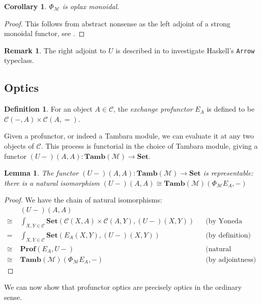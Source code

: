 \documentclass[11pt,a4paper]{article}
\theoremstyle{plain}
\newtheorem{lemma}[theorem]{Lemma}
\newtheorem{corollary}[theorem]{Corollary}
\theoremstyle{definition}
\newtheorem{definition}[theorem]{Definition}
\newtheorem{remark}[theorem]{Remark}
\newcommand{\C}{\mathscr{C}}
\newcommand{\M}{\mathscr{M}}
\newcommand{\Pastro}{\Phi}
\newcommand{\Set}{\mathbf{Set}}
\newcommand{\Prof}{\mathbf{Prof}}
\newcommand{\Tamb}{\mathbf{Tamb}}
\begin{document}
\begin{corollary}
  $\Pastro_\M$ is oplax monoidal.
\end{corollary}
\begin{proof}
  This follows from abstract nonsense as the left adjoint of a strong monoidal functor, see \cite{Kelly1974}.
\end{proof}

\begin{remark}
  The right adjoint to $U$ is described in \cite{NotionsOfComputationAsMonoids} to investigate Haskell's \texttt{Arrow} typeclass.
\end{remark}

\subsection{Optics}
\begin{definition}
  For an object $A \in \C$, the \emph{exchange profunctor} $E_A$ is defined to be $\C(-, A) \times \C(A, {=})$.
\end{definition}

Given a profunctor, or indeed a Tambara module, we can evaluate it at any two objects of $\C$. This process is functorial in the choice of Tambara module, giving a functor $(U-)(A,A) : \Tamb(\M) \to \Set$.

\begin{lemma}\label{lemma-rep}
  The functor $(U-)(A,A) : \Tamb(\M) \to \Set$ is representable: there is a natural isomorphism
  $(U-)(A,A) \cong \Tamb(\M)(\Pastro_\M E_A, -)$
\end{lemma}
\begin{proof}
  We have the chain of natural isomorphisms:
  \begin{align*}
    &(U-)(A,A) \\
    \cong \;&\int_{X,Y \in \C} \Set(\C(X,A) \times \C(A,Y), (U-)(X,Y)) && \text{(by Yoneda reduction twice)} \\
    =\;&\int_{X,Y \in \C} \Set(E_A(X,Y), (U-)(X,Y)) && \text{(by definition)}\\
    \cong \;&\Prof(E_A, U-) && \text{(natural transformations as ends)} \\
    \cong \;&\Tamb(\M)(\Pastro_\M E_A, -) && \text{(by adjointness)}
  \end{align*}
\end{proof}

We can now show that profunctor optics are precisely optics in the ordinary sense.
\end{document}

